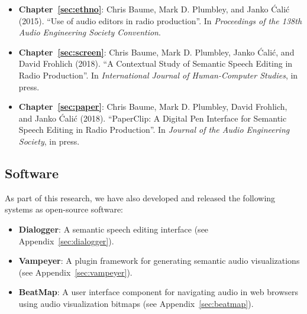 
\nocite{Baume2015,Baume2018a,Baume2018}
\begin{itemize}
  \item \textbf{Chapter~\ref{sec:ethno}}: Chris Baume, Mark D. Plumbley, and Janko \'{C}ali\'{c} (2015). ``Use of audio
    editors in radio production''. In \textit{Proceedings of the 138th Audio Engineering Society Convention}.
  \item \textbf{Chapter~\ref{sec:screen}}: Chris Baume, Mark D. Plumbley, Janko \'{C}ali\'{c}, and David Frohlich
    (2018). ``A Contextual Study of Semantic Speech Editing in Radio Production''. In \textit{International Journal of
    Human-Computer Studies}, in press.
  \item \textbf{Chapter~\ref{sec:paper}}: Chris Baume, Mark D. Plumbley, David Frohlich, and Janko \'{C}ali\'{c}
    (2018).  ``PaperClip: A Digital Pen Interface for Semantic Speech Editing in Radio Production''. In \textit{Journal
    of the Audio Engineering Society}, in press.   
\end{itemize}

\subsection*{Software}
As part of this research, we have also developed and released the following systems as open-source software:

\begin{itemize}
  \item \textbf{Dialogger}: A semantic speech editing interface (see Appendix~\ref{sec:dialogger}).
  \item \textbf{Vampeyer}: A plugin framework for generating semantic audio visualizations (see
    Appendix~\ref{sec:vampeyer}).
  \item \textbf{BeatMap}: A user interface component for navigating audio in web browsers using audio visualization
    bitmaps (see Appendix~\ref{sec:beatmap}).
\end{itemize}

